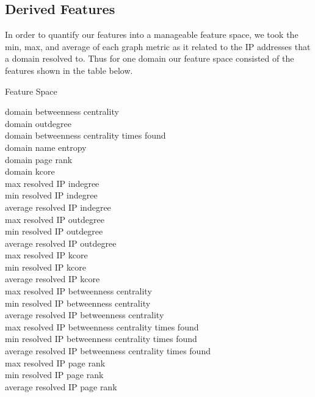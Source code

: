 \documentclass{acm_proc_article-sp}
\begin{document}
\subsection{Derived Features}
In order to quantify our features into a manageable feature space, we took the min, max, and average of each graph metric as it related to the IP addresses that a domain resolved to. Thus for one domain our feature space consisted of the features shown in the table below.
\begin{table}[h]
\centering
\caption{Feature Space}
\Centering
\hline
 \hline
    domain betweenness centrality \\
    domain outdegree \\
    domain betweenness centrality times found \\
    domain name entropy \\
    domain page rank \\
    domain kcore \\
    max resolved IP indegree \\
    min resolved IP indegree \\
    average resolved IP indegree \\
    max resolved IP outdegree \\
    min resolved IP outdegree \\
    average resolved IP outdegree \\
    max resolved IP kcore \\
    min resolved IP kcore \\
    average resolved IP kcore \\
    max resolved IP betweenness centrality \\
    min resolved IP betweenness centrality \\
    average resolved IP betweenness centrality \\
    max resolved IP betweenness centrality times found \\
    min resolved IP betweenness centrality times found \\
    average resolved IP betweenness centrality times found \\
    max resolved IP page rank \\
    min resolved IP page rank \\ 
    average resolved IP page rank \\
\hline
\vspace{2mm}
\label{table:1}
\end{table}
\end{document}
